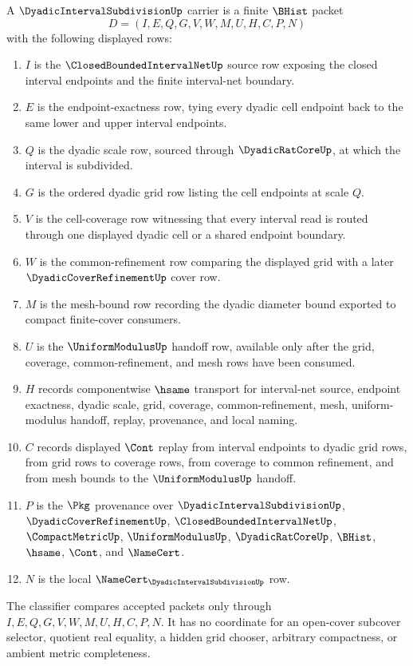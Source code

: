 \begin{definition}
\label{def:dyadic-interval-subdivision-carrier}
A $\DyadicIntervalSubdivisionUp$ carrier is a finite $\BHist$ packet
$$
D=(I,E,Q,G,V,W,M,U,H,C,P,N)
$$
with the following displayed rows:
\begin{enumerate}
\item $I$ is the $\ClosedBoundedIntervalNetUp$ source row exposing the closed interval endpoints and the finite interval-net boundary.
\item $E$ is the endpoint-exactness row, tying every dyadic cell endpoint back to the same lower and upper interval endpoints.
\item $Q$ is the dyadic scale row, sourced through $\DyadicRatCoreUp$, at which the interval is subdivided.
\item $G$ is the ordered dyadic grid row listing the cell endpoints at scale $Q$.
\item $V$ is the cell-coverage row witnessing that every interval read is routed through one displayed dyadic cell or a shared endpoint boundary.
\item $W$ is the common-refinement row comparing the displayed grid with a later $\DyadicCoverRefinementUp$ cover row.
\item $M$ is the mesh-bound row recording the dyadic diameter bound exported to compact finite-cover consumers.
\item $U$ is the $\UniformModulusUp$ handoff row, available only after the grid, coverage, common-refinement, and mesh rows have been consumed.
\item $H$ records componentwise $\hsame$ transport for interval-net source, endpoint exactness, dyadic scale, grid, coverage, common-refinement, mesh, uniform-modulus handoff, replay, provenance, and local naming.
\item $C$ records displayed $\Cont$ replay from interval endpoints to dyadic grid rows, from grid rows to coverage rows, from coverage to common refinement, and from mesh bounds to the $\UniformModulusUp$ handoff.
\item $P$ is the $\Pkg$ provenance over $\DyadicIntervalSubdivisionUp$, $\DyadicCoverRefinementUp$, $\ClosedBoundedIntervalNetUp$, $\CompactMetricUp$, $\UniformModulusUp$, $\DyadicRatCoreUp$, $\BHist$, $\hsame$, $\Cont$, and $\NameCert$.
\item $N$ is the local $\NameCert_{\DyadicIntervalSubdivisionUp}$ row.
\end{enumerate}
The classifier compares accepted packets only through $I,E,Q,G,V,W,M,U,H,C,P,N$. It has no coordinate for an open-cover subcover selector, quotient real equality, a hidden grid chooser, arbitrary compactness, or ambient metric completeness.
\end{definition}

